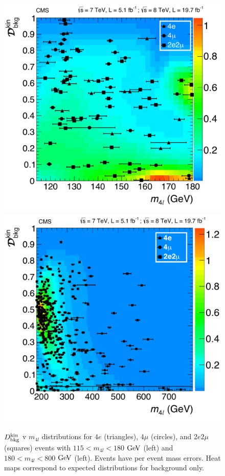\begin{figure}[htbp]
\begin{center}
\includegraphics[width=.45\linewidth]{HiggsDiscovery/figures/KD_vs_m4l_lowMass_Back.pdf}
\includegraphics[width=.45\linewidth]{HiggsDiscovery/figures/KD_vs_m4l_highMass_Back.pdf}
\caption[Observed $D_{\rm{bkg}}^{\rm{kin}}$ Distributions for $4l$ Events]{$D_{\rm{bkg}}^{\rm{kin}}$ v $m_{4l}$ distributions for $4e$ (triangles), $4\mu$ (circles), and $2e2\mu$ (squares) events with $115 < m_{4l} < 180$ $\rm{GeV}$ (left) and $180 < m_{4l} < 800$ $\rm{GeV}$ (left). Events have per event mass errors. Heat maps correspond to expected distributions for background only.}
\label{fig:Dbkg_2D_Results}
\end{center}
\end{figure}

